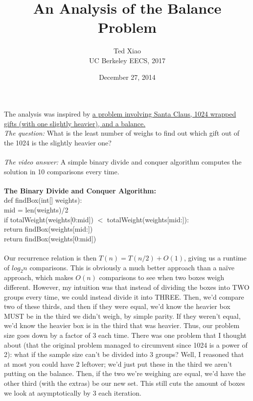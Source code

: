 \documentclass[11pt]{article}
\title{An Analysis of the Balance Problem}
\date{December 27, 2014}
\author{Ted Xiao\\ UC Berkeley EECS, 2017}
\begin{document}
\maketitle

The analysis was inspired by \href{https://www.youtube.com/watch?v=wVPCT1VjySA}{a problem involving Santa Claus, 1024 wrapped gifts (with one slightly heavier), and a balance.}\\
 
\textit{The question:} What is the least number of weighs to find out which gift out of the 1024 is the slightly heavier one? \\\\
\indent\textit{The video answer:} A simple binary divide and conquer algorithm computes the solution in 10 comparisons every time. \\\\
\textbf{The Binary Divide and Conquer Algorithm:} \\
def findBox(int[] weights):\\
\indent mid = len(weights)/2\\
\indent if totalWeight(weights[0:mid]) $<$ totalWeight(weights[mid:]):\\
\indent \indent	return findBox(weights[mid:])\\
\indent	return findBox(weights[0:mid])\\\\
\newline
\indent Our recurrence relation is then $T(n) = T(n/2) + O(1)$, giving us a runtime of $log_2{n}$ comparisons. This is obviously a much better approach than a naïve approach, which makes $O(n)$ comparisons to see when two boxes weigh different. 
\newline \newline
\indent However, my intuition was that instead of dividing the boxes into TWO groups every time, we could instead divide it into THREE. Then, we’d compare two of these thirds, and then if they were equal, we’d know the heavier box MUST be in the third we didn’t weigh, by simple parity. If they weren’t equal, we’d know the heavier box is in the third that was heavier. Thus, our problem size goes down by a factor of 3 each time. There was one problem that I thought about (that the original problem managed to circumvent since 1024 is a power of 2): what if the sample size can’t be divided into 3 groups? Well, I reasoned that at most you could have 2 leftover; we’d just put these in the third we aren’t putting on the balance. Then, if the two we’re weighing are equal, we’d have the other third (with the extras) be our new set. This still cuts the amount of boxes we look at asymptotically by 3 each iteration. \\\\
\end{document}
